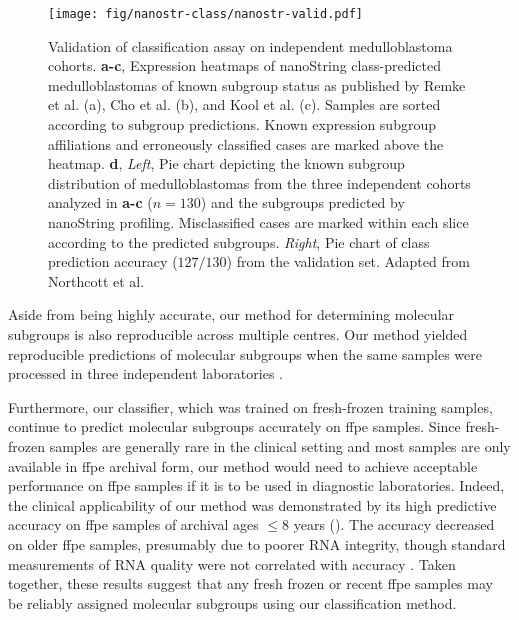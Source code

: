\begin{figure}[hb]
	\begin{center}
		\texttt{[image: fig/nanostr-class/nanostr-valid.pdf]}
	\end{center}
	\caption[Validation of classification assay on independent medulloblastoma cohorts]
	{
	Validation of classification assay on independent medulloblastoma cohorts.
	\textbf{a-c}, Expression heatmaps of nanoString class-predicted medulloblastomas of known subgroup status as published by Remke et al. (a), Cho et al. (b), and Kool et al. (c). Samples are sorted according to subgroup predictions. Known expression subgroup affiliations and erroneously classified cases are marked above the heatmap.
	\textbf{d}, \emph{Left}, Pie chart depicting the known subgroup distribution of medulloblastomas from the three independent cohorts analyzed in \textbf{a-c} ($n = 130$) and the subgroups predicted by nanoString profiling. Misclassified cases are marked within each slice according to the predicted subgroups. \emph{Right}, Pie chart of class prediction accuracy ($127/130$) from the validation set. Adapted from Northcott et al.
	}
	\label{fig:nanostr-valid}
\end{figure}

Aside from being highly accurate, our method for determining molecular subgroups is also reproducible across multiple centres. Our method yielded reproducible predictions of molecular subgroups when the same samples were processed in three independent laboratories .

\clearpage

Furthermore, our classifier, which was trained on fresh-frozen training samples, continue to predict molecular subgroups accurately on \gls{ffpe} samples. Since fresh-frozen samples are generally rare in the clinical setting and most samples are only available in \gls{ffpe} archival form, our method would need to achieve acceptable performance on \gls{ffpe} samples if it is to be used in diagnostic laboratories. Indeed, the clinical applicability of our method was demonstrated by its high predictive accuracy on \gls{ffpe} samples of archival ages $\leq 8$ years (). The accuracy decreased on older \gls{ffpe} samples, presumably due to poorer RNA integrity, though standard measurements of RNA quality were not correlated with accuracy . Taken together, these results suggest that any fresh frozen or recent \gls{ffpe} samples may be reliably assigned molecular subgroups using our classification method.

